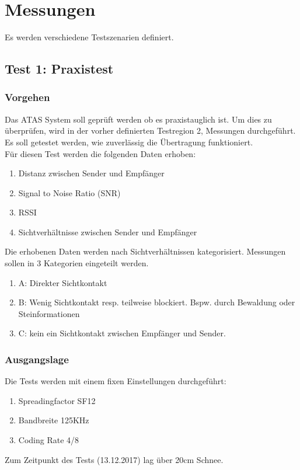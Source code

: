 \documentclass[11pt,english,german]{report}
\theoremstyle{definition}
\begin{document}
\newpage
\section{Messungen}
Es werden verschiedene Testszenarien definiert.

\subsection{Test 1: Praxistest}
\subsubsection{Vorgehen}
Das ATAS System soll geprüft werden ob es praxistauglich ist. Um dies zu überprüfen, wird in der vorher definierten Testregion 2, Messungen durchgeführt. Es soll getestet werden, wie zuverlässig die Übertragung funktioniert.\\[0.3cm]
Für diesen Test werden die folgenden Daten erhoben:
\begin{enumerate}
	\item Distanz zwischen Sender und Empfänger
	\item Signal to Noise Ratio (SNR)
	\item RSSI
	\item Sichtverhältnisse zwischen Sender und Empfänger
\end{enumerate}	
Die erhobenen Daten werden nach Sichtverhältnissen kategorisiert. Messungen sollen in 3 Kategorien eingeteilt werden.
\begin{enumerate}
	\item A: Direkter Sichtkontakt
	\item B: Wenig Sichtkontakt resp. teilweise blockiert. Bspw. durch Bewaldung oder Steinformationen
	\item C: kein ein Sichtkontakt zwischen Empfänger und Sender.
\end{enumerate}
\subsubsection{Ausgangslage}
Die Tests werden mit einem fixen Einstellungen durchgeführt:
\begin{enumerate}
	\item Spreadingfactor SF12
	\item Bandbreite 125KHz
	\item Coding Rate 4/8
\end{enumerate}
Zum Zeitpunkt des Tests (13.12.2017) lag über 20cm Schnee.
\newpage
\end{document}
